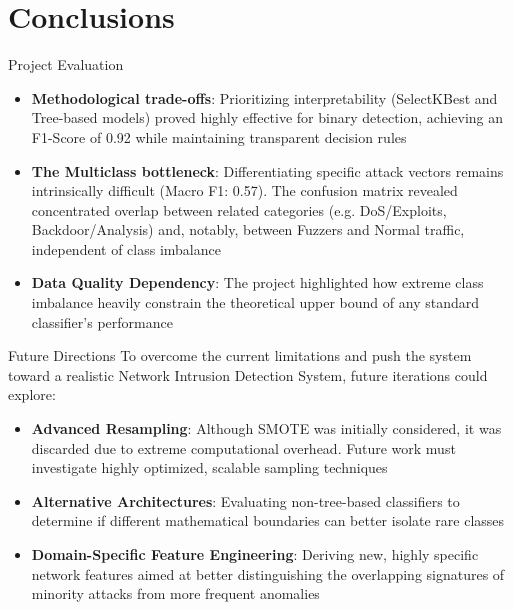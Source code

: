 \documentclass{beamer}
\begin{document}
\section{Conclusions}

\begin{frame}{Project Evaluation}
  \begin{itemize}
    \item \textbf{Methodological trade-offs}: Prioritizing interpretability 
      (SelectKBest and Tree-based models) proved highly effective for binary 
      detection, achieving an F1-Score of 0.92 while maintaining transparent 
      decision rules
    \vspace{0.2cm}
    \item \textbf{The Multiclass bottleneck}: Differentiating specific attack 
      vectors remains intrinsically difficult (Macro F1: 0.57). The confusion matrix revealed concentrated overlap between related categories (e.g. DoS/Exploits, Backdoor/Analysis) and, notably, between Fuzzers and Normal traffic, independent of class imbalance
    \vspace{0.2cm}
    \item \textbf{Data Quality Dependency}: The project highlighted how extreme class 
      imbalance heavily constrain the theoretical upper bound of any 
      standard classifier's performance
  \end{itemize}
\end{frame}

\begin{frame}{Future Directions}
  To overcome the current limitations and push the system toward a realistic Network Intrusion Detection System, future iterations 
  could explore:
  
  \vspace{0.3cm}
  \begin{itemize}
    \item \textbf{Advanced Resampling}: Although SMOTE was initially considered, it was discarded due to extreme computational overhead. Future work must investigate highly optimized, scalable sampling techniques
    \vspace{0.2cm}
    \item \textbf{Alternative Architectures}: Evaluating non-tree-based classifiers to determine if different mathematical boundaries can better isolate rare classes
    \vspace{0.2cm}
    \item \textbf{Domain-Specific Feature Engineering}: Deriving new, highly specific network features aimed at better distinguishing the overlapping signatures of minority attacks from more frequent anomalies
  \end{itemize}
\end{frame}
\end{document}
